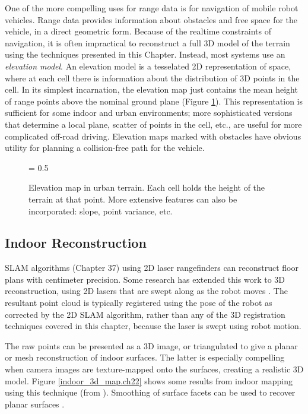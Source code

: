 \documentclass[twocolumn,oneside]{book}
\begin{document}
One of the more compelling uses for range data is for navigation of
mobile robot vehicles.  Range data provides information about
obstacles and free space for the vehicle, in a direct geometric form.
Because of the realtime constraints of navigation, it is often
impractical to reconstruct a full 3D model of the terrain using the
techniques presented in this Chapter.  Instead, most systems use an
{\em elevation model}.  An elevation model is a tesselated 2D
representation of space, where at each cell there is information about
the distribution of 3D points in the cell.  In its simplest
incarnation, the elevation map just contains the mean height of range
points above the nominal ground plane (Figure
\ref{elevation_map.ch22}).  This representation is sufficient for some
indoor and urban environments; more sophisticated versions that
determine a local plane, scatter of points in the cell, etc., are
useful for more complicated off-road driving.  Elevation maps marked
with obstacles have obvious utility for planning a collision-free path
for the vehicle.

\begin{figure}[hbt]
{\epsfxsize = 0.5\textwidth {}}
\caption{Elevation map in urban terrain.  Each cell holds the height
of the terrain at that point.  More extensive features can also be
incorporated: slope, point variance, etc.
\label{elevation_map.ch22}}
\end{figure}


\subsection{Indoor Reconstruction}

SLAM algorithms (Chapter 37) using 2D laser rangefinders can
reconstruct floor plans with centimeter precision.  Some research has
extended this work to 3D reconstruction, using 2D lasers that are
swept along as the robot moves \cite{thrun00}.  The resultant point
cloud is typically registered using the pose of the robot as corrected
by the 2D SLAM algorithm, rather than any of the 3D registration
techniques covered in this chapter, because the laser is swept using
robot motion.

The raw points can be presented as a 3D image, or triangulated to give
a planar or mesh reconstruction of indoor surfaces. 
The latter is
especially compelling when camera images are texture-mapped onto the
surfaces, creating a realistic 3D model.  Figure
\ref{indoor_3d_map.ch22} shows some results from indoor mapping using
this technique (from \cite{thrun00}).  Smoothing of surface facets can
be used to recover planar surfaces \cite{liu01}.
\end{document}
